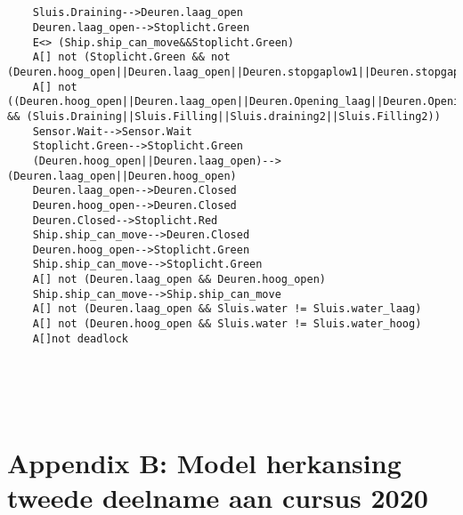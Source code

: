  
 \begin{verbatim}
 	
 	 
 	Sluis.Draining-->Deuren.laag_open
 	Deuren.laag_open-->Stoplicht.Green
 	E<> (Ship.ship_can_move&&Stoplicht.Green)
 	A[] not (Stoplicht.Green && not (Deuren.hoog_open||Deuren.laag_open||Deuren.stopgaplow1||Deuren.stopgaplow2||Deuren.stopgaphigh1||Deuren.stopgaphigh2))
 	A[] not ((Deuren.hoog_open||Deuren.laag_open||Deuren.Opening_laag||Deuren.Opening_hoog||Deuren.Closing_hoog||Deuren.Closing_laag) && (Sluis.Draining||Sluis.Filling||Sluis.draining2||Sluis.Filling2))
 	Sensor.Wait-->Sensor.Wait
 	Stoplicht.Green-->Stoplicht.Green
 	(Deuren.hoog_open||Deuren.laag_open)-->(Deuren.laag_open||Deuren.hoog_open)
 	Deuren.laag_open-->Deuren.Closed
 	Deuren.hoog_open-->Deuren.Closed
 	Deuren.Closed-->Stoplicht.Red
 	Ship.ship_can_move-->Deuren.Closed
 	Deuren.hoog_open-->Stoplicht.Green
 	Ship.ship_can_move-->Stoplicht.Green
 	A[] not (Deuren.laag_open && Deuren.hoog_open)
 	Ship.ship_can_move-->Ship.ship_can_move
 	A[] not (Deuren.laag_open && Sluis.water != Sluis.water_laag)
 	A[] not (Deuren.hoog_open && Sluis.water != Sluis.water_hoog)
 	A[]not deadlock
 	
	
 \end{verbatim}
 
 \newpage
 \section{\\ Appendix B: Model herkansing tweede deelname aan cursus 2020}
 

